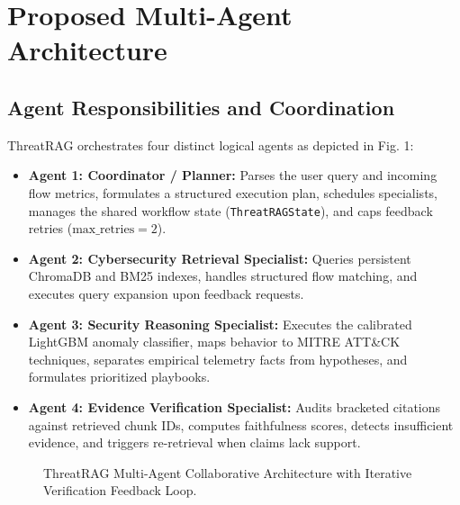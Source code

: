 \documentclass[conference]{IEEEtran}
\begin{document}
\section{Proposed Multi-Agent Architecture}
\subsection{Agent Responsibilities and Coordination}
ThreatRAG orchestrates four distinct logical agents as depicted in Fig. 1:
\begin{itemize}
    \item \textbf{Agent 1: Coordinator / Planner:} Parses the user query and incoming flow metrics, formulates a structured execution plan, schedules specialists, manages the shared workflow state (\texttt{ThreatRAGState}), and caps feedback retries ($\text{max\_retries} = 2$).
    \item \textbf{Agent 2: Cybersecurity Retrieval Specialist:} Queries persistent ChromaDB and BM25 indexes, handles structured flow matching, and executes query expansion upon feedback requests.
    \item \textbf{Agent 3: Security Reasoning Specialist:} Executes the calibrated LightGBM anomaly classifier, maps behavior to MITRE ATT\&CK techniques, separates empirical telemetry facts from hypotheses, and formulates prioritized playbooks.
    \item \textbf{Agent 4: Evidence Verification Specialist:} Audits bracketed citations against retrieved chunk IDs, computes faithfulness scores, detects insufficient evidence, and triggers re-retrieval when claims lack support.
\end{itemize}

\begin{figure}[t]
\centering
{}
\caption{ThreatRAG Multi-Agent Collaborative Architecture with Iterative Verification Feedback Loop.}
\label{fig:arch}
\end{figure}
\end{document}
